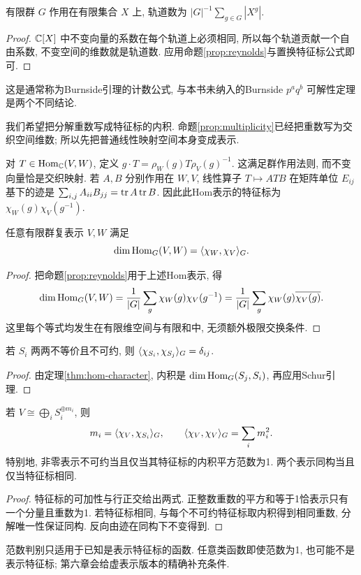 \begin{corollary}[轨道计数公式]\label{cor:burnside-count}
有限群 $G$ 作用在有限集合 $X$ 上, 轨道数为 $|G|^{-1}\sum_{g\in G}|X^g|$.
\end{corollary}
\begin{proof}
$\mathbb C[X]$ 中不变向量的系数在每个轨道上必须相同, 所以每个轨道贡献一个自由系数, 不变空间的维数就是轨道数. 应用命题\ref{prop:reynolds}与置换特征标公式即可.
\end{proof}
这是通常称为Burnside引理的计数公式, 与本书未纳入的Burnside $p^aq^b$ 可解性定理是两个不同结论.

我们希望把分解重数写成特征标的内积. 命题\ref{prop:multiplicity}已经把重数写为交织空间维数; 所以先把普通线性映射空间本身变成表示.

对 $T\in\operatorname{Hom}_\mathbb C(V,W)$, 定义 $g\cdot T=\rho_W(g)T\rho_V(g)^{-1}$. 这满足群作用法则, 而不变向量恰是交织映射. 若 $A,B$ 分别作用在 $W,V$, 线性算子 $T\mapsto ATB$ 在矩阵单位 $E_{ij}$ 基下的迹是 $\sum_{i,j}A_{ii}B_{jj}=\operatorname{tr} A\operatorname{tr} B$. 因此此Hom表示的特征标为 $\chi_W(g)\chi_V(g^{-1})$.

\begin{theorem}\label{thm:hom-character}
任意有限群复表示 $V,W$ 满足
\[
 \dim\operatorname{Hom}_G(V,W)=\langle \chi_W,\chi_V\rangle_G.
\]
\end{theorem}
\begin{proof}
把命题\ref{prop:reynolds}用于上述Hom表示, 得
\[
 \dim\operatorname{Hom}_G(V,W)=\frac1{|G|}\sum_g\chi_W(g)\chi_V(g^{-1})
 =\frac1{|G|}\sum_g\chi_W(g)\overline{\chi_V(g)}.
\]
这里每个等式均发生在有限维空间与有限和中, 无须额外极限交换条件.
\end{proof}

\begin{corollary}[不可约特征标的行正交]\label{cor:roworth}
若 $S_i$ 两两不等价且不可约, 则 $\langle \chi_{S_i},\chi_{S_j}\rangle_G=\delta_{ij}$.
\end{corollary}
\begin{proof}
由定理\ref{thm:hom-character}, 内积是 $\dim\operatorname{Hom}_G(S_j,S_i)$, 再应用Schur引理.
\end{proof}
\begin{corollary}\label{cor:char-decomposition}
若 $V\cong\bigoplus_i S_i^{\oplus m_i}$, 则
\[
 m_i=\langle \chi_V,\chi_{S_i}\rangle_G,\qquad
 \langle \chi_V,\chi_V\rangle_G=\sum_i m_i^2.
\]
特别地, 非零表示不可约当且仅当其特征标的内积平方范数为1. 两个表示同构当且仅当特征标相同.
\end{corollary}
\begin{proof}
特征标的可加性与行正交给出两式. 正整数重数的平方和等于1恰表示只有一个分量且重数为1. 若特征标相同, 与每个不可约特征标取内积得到相同重数, 分解唯一性保证同构. 反向由迹在同构下不变得到.
\end{proof}
范数判别只适用于已知是表示特征标的函数. 任意类函数即使范数为1, 也可能不是表示特征标; 第六章会给虚表示版本的精确补充条件.

